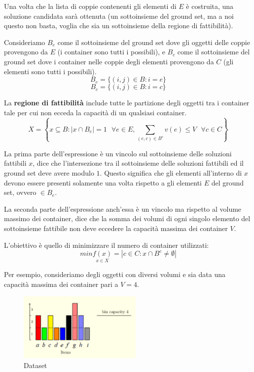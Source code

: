 \documentclass{article}
\begin{document}
Una volta che la lista di coppie contenenti gli elementi di $E$ è costruita, una soluzione candidata sarà ottenuta
(un sottoinsieme del ground set, ma a noi questo non basta, voglia che sia un sottoinsieme della regione di fattibilità).

Consideriamo $B_e$ come il sottoinsieme del ground set dove gli oggetti delle coppie provengono da $E$ (i container sono tutti i possibili), e $B_c$ come il sottoinsieme del ground set dove i container nelle coppie degli elementi provengono da $C$ (gli elementi sono tutti i possibili).
$$B_e=\{(i,j) \in B : i=e\}$$
$$B_c=\{(i,j) \in B : i=c\}$$

La \textbf{regione di fattibilità} include tutte le partizione degli oggetti tra i
container tale per cui non ecceda la capacità di un qualsiasi container.
$$X=\left\{ x\subseteq B : |x\cap B_e|=1\text{ } \forall e \in E, \sum_{(e,c) \in B^c} v(e)\leq V \text{ } \forall c\in C \right\}$$

La prima parte dell'espressione è un vincolo sul sottoinsieme delle soluzioni fattibili $x$, dice che l'intersezione tra il sottoinsieme delle soluzioni fattibili ed il ground set deve avere modulo $1$. Questo significa che gli elementi
all'interno di $x$ devono essere presenti solamente una volta rispetto a gli elementi $E$ del ground set, ovvero $\in B_e$.

La seconda parte dell'espressione anch'essa è un vincolo ma rispetto al volume massimo dei container, dice che la somma dei volumi
di ogni singolo elemento del sottoinsieme fattibile non deve eccedere la capacità massima dei container $V$.

L'obiettivo è quello di minimizzare il numero di container utilizzati:
$$min\underset{x\in X}{f(x)}=|{c \in C : x\cap B^c \neq \emptyset}|$$

Per esempio, consideriamo degli oggetti con diversi volumi e sia data una capacità massima dei container pari a $V=4$.

\begin{figure}[H]
    \centering
    \includegraphics[width=6cm]{images/grap_BPP.png}
    \caption{Dataset}
    \label{fig:grap_BPP}
\end{figure}
\end{document}
